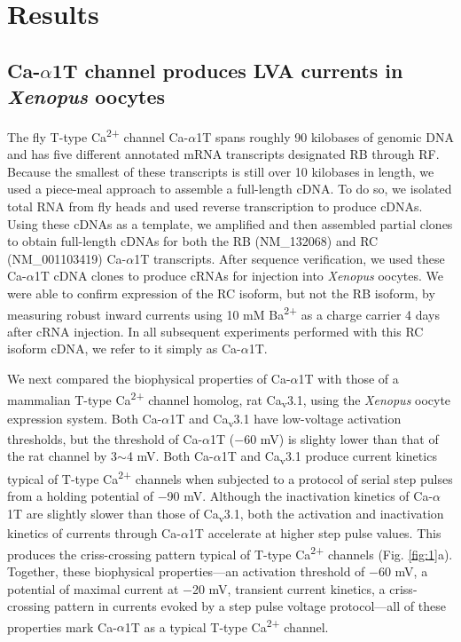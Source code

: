 \section*{Results}

\subsection*{Ca-$\alpha$1T channel produces LVA currents in \emph{Xenopus} oocytes}

The fly T-type Ca\textsuperscript{2+} channel Ca-$\alpha$1T spans roughly 90 kilobases of genomic DNA and has five different annotated mRNA transcripts designated RB through RF.
Because the smallest of these transcripts is still over 10 kilobases in length, we used a piece-meal approach to assemble a full-length cDNA.
To do so, we isolated total RNA from fly heads and used reverse transcription to produce cDNAs.
Using these cDNAs as a template, we amplified and then assembled partial clones to obtain full-length cDNAs for both the RB (NM_132068) and RC (NM_001103419) Ca-$\alpha$1T transcripts.
After sequence verification, we used these Ca-$\alpha$1T cDNA clones to produce cRNAs for injection into \emph{Xenopus} oocytes.
We were able to confirm expression of the RC isoform, but not the RB isoform, by measuring robust inward currents using 10 mM Ba\textsuperscript{2+} as a charge carrier 4 days after cRNA injection. 
In all subsequent experiments performed with this RC isoform cDNA, we refer to it simply as Ca-$\alpha$1T.

We next compared the biophysical properties of Ca-$\alpha$1T with those of a mammalian T-type Ca\textsuperscript{2+} channel homolog, rat Ca\textsubscript{v}3.1\cite{PerezReyes:1998gn}, using the \emph{Xenopus} oocyte expression system.
Both Ca-$\alpha$1T and Ca\textsubscript{v}3.1 have low-voltage activation thresholds, but the threshold of Ca-$\alpha$1T ($-$60 mV) is slighty lower than that of the rat channel by 3$\sim$4 mV.
Both Ca-$\alpha$1T and Ca\textsubscript{v}3.1 produce current kinetics typical of T-type Ca\textsuperscript{2+} channels when subjected to a protocol of serial step pulses from a holding potential of $-$90 mV.
Although the inactivation kinetics of Ca-$\alpha$1T are slightly slower than those of Ca\textsubscript{v}3.1, both the activation and inactivation kinetics of currents through Ca-$\alpha$1T accelerate at higher step pulse values. This produces the criss-crossing pattern typical of T-type Ca\textsuperscript{2+} channels (Fig. \ref{fig:1}a).
Together, these biophysical properties---an activation threshold of $-$60 mV, a potential of maximal current at $-$20 mV, transient current kinetics, a criss-crossing pattern in currents evoked by a step pulse voltage protocol---all of these properties mark Ca-$\alpha$1T as a typical T-type Ca\textsuperscript{2+} channel\cite{PerezReyes:1998gn,carbone:1984aa,Cribbs:1998vc,lee:1999aa}.

